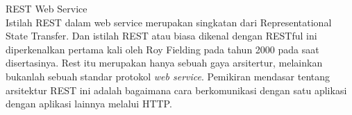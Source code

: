 \documentclass[12pt, times new roman, a4paper]{article}
\begin{document}
\noindent REST Web Service\\
\indent Istilah REST dalam web service merupakan singkatan dari Representational State Transfer. Dan istilah REST  atau biasa dikenal dengan RESTful ini diperkenalkan pertama kali oleh  Roy Fielding pada tahun 2000 pada saat disertasinya. Rest itu merupakan hanya sebuah gaya arsitertur, melainkan  bukanlah sebuah standar protokol \textit {web service}. Pemikiran mendasar tentang arsitektur REST ini adalah bagaimana cara berkomunikasi dengan satu aplikasi dengan aplikasi lainnya melalui HTTP.
\end{document}

